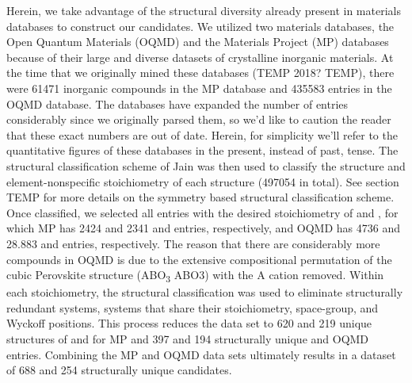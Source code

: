 %
Herein, we take advantage of the structural diversity already present in materials databases to construct our candidates.
%
We utilized two materials databases, the Open Quantum Materials (OQMD) and the Materials Project (MP) databases because of their large and diverse datasets of crystalline inorganic materials.
%
At the time that we originally mined these databases (TEMP 2018? TEMP), there were \num{61471} inorganic compounds in the MP database and \num{435583} entries in the OQMD database.
%
The databases have expanded the number of entries considerably since we originally parsed them, so we'd like to caution the reader that these exact numbers are out of date.
%
Herein, for simplicity we'll refer to the quantitative figures of these databases in the present, instead of past, tense.
%
The structural classification scheme of Jain  \cite{Jain2018} was then used to classify the structure and element-nonspecific stoichiometry of each structure (\num{497054} in total).
%
See section TEMP for more details on the symmetry based structural classification scheme.
%
Once classified, we selected all entries with the desired stoichiometry of \ABtwo and \ABthree,
for which MP has \num{2424} and \num{2341} \ABtwo and \ABthree entries, respectively,
and OQMD has \num{4736} and \num{28,883} \ABtwo and \ABthree entries, respectively.
%
The reason that there are considerably more \ABthree compounds in OQMD is due to the extensive compositional permutation of the cubic Perovskite structure (ABO\textsubscript{3} ABO3) with the A cation removed.
%
Within each stoichiometry, the structural classification was used to eliminate structurally redundant systems,  systems that share their stoichiometry, space-group, and Wyckoff positions.
%
This process reduces the data set to \num{620} and \num{219} unique structures of \ABtwo and \ABthree for MP and \num{397} and \num{194} structurally unique \ABtwo and \ABthree OQMD entries.
%
Combining the MP and OQMD data sets ultimately results in a dataset of \num{688} \ABtwo and \num{254} \ABthree structurally unique candidates.


